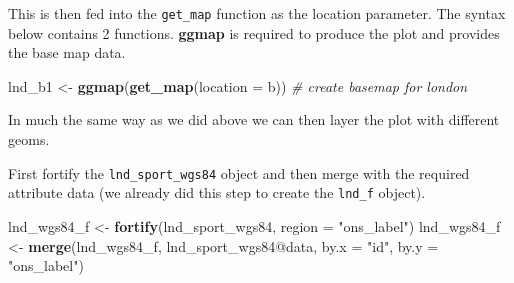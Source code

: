 \documentclass[]{article}
\newenvironment{Shaded}{}{}
\newcommand{\KeywordTok}[1]{\textcolor[rgb]{0.00,0.44,0.13}{\textbf{{#1}}}}
\newcommand{\DataTypeTok}[1]{\textcolor[rgb]{0.56,0.13,0.00}{{#1}}}
\newcommand{\DecValTok}[1]{\textcolor[rgb]{0.25,0.63,0.44}{{#1}}}
\newcommand{\FloatTok}[1]{\textcolor[rgb]{0.25,0.63,0.44}{{#1}}}
\newcommand{\StringTok}[1]{\textcolor[rgb]{0.25,0.44,0.63}{{#1}}}
\newcommand{\CommentTok}[1]{\textcolor[rgb]{0.38,0.63,0.69}{\textit{{#1}}}}
\newcommand{\NormalTok}[1]{{#1}}
\begin{document}
\begin{Shaded}
\end{Shaded}

This is then fed into the \texttt{get\_map} function as the location
parameter. The syntax below contains 2 functions. \textbf{ggmap} is
required to produce the plot and provides the base map data.

\begin{Shaded}
\begin{Highlighting}[]
\NormalTok{lnd_b1 <-}\StringTok{ }\KeywordTok{ggmap}\NormalTok{(}\KeywordTok{get_map}\NormalTok{(}\DataTypeTok{location =} \NormalTok{b)) }\CommentTok{# create basemap for london}
\end{Highlighting}
\end{Shaded}

In much the same way as we did above we can then layer the plot with
different geoms.

First fortify the \texttt{lnd\_sport\_wgs84} object and then merge with
the required attribute data (we already did this step to create the
\texttt{lnd\_f} object).

\begin{Shaded}
\begin{Highlighting}[]
\NormalTok{lnd_wgs84_f <-}\StringTok{ }\KeywordTok{fortify}\NormalTok{(lnd_sport_wgs84, }\DataTypeTok{region =} \StringTok{"ons_label"}\NormalTok{)}
\NormalTok{lnd_wgs84_f <-}\StringTok{ }\KeywordTok{merge}\NormalTok{(lnd_wgs84_f, lnd_sport_wgs84@data,}
                      \DataTypeTok{by.x =} \StringTok{"id"}\NormalTok{, }\DataTypeTok{by.y =} \StringTok{"ons_label"}\NormalTok{)}
\end{Highlighting}
\end{Shaded}
\end{document}
